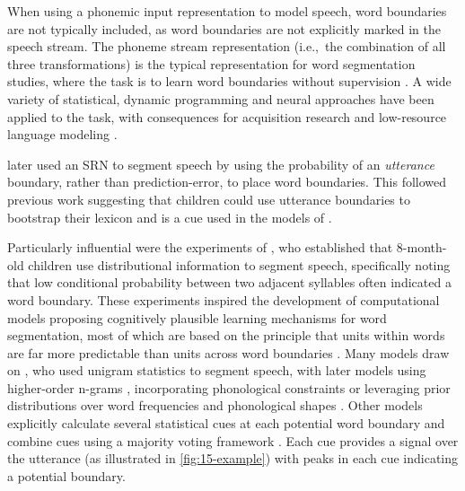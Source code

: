 When using a phonemic input representation to model speech, word boundaries are not typically included, as word boundaries are not explicitly marked in the speech stream. The phoneme stream representation (i.e.,\ the combination of all three transformations) is the typical representation for word segmentation studies, where the task is to learn word boundaries without supervision \citep{Brent1999}. A wide variety of statistical, dynamic programming and neural approaches have been applied to the task, with consequences for acquisition research and low-resource language modeling \citep{Blanchard2010, Coltekin2017, algayres_dp-parse_2022, goriely2023word}.


\citet{christiansen1998learning} later used an SRN to segment speech by using the probability of an \emph{utterance} boundary, rather than prediction-error, to place word boundaries. This followed previous work suggesting that children could use utterance boundaries to bootstrap their lexicon \citep{aslin1996models} and is a cue used in the models of \citet{ccoltekin2014explicit, goriely2023word}.


Particularly influential were the experiments of \citet{Saffran1996learning}, who established that 8-month-old children use distributional information to segment speech, specifically noting that low conditional probability %
between two adjacent syllables often indicated a word boundary. These experiments inspired the development of computational models proposing cognitively plausible learning mechanisms for word segmentation, most of which are based on the principle that units within words are far more predictable than units across word boundaries \citep{harris1955}. Many models draw on \citet{Brent1999}, who used unigram statistics to segment speech, with later models using higher-order n-grams \citep{Venkataraman2001}, incorporating phonological constraints \citep{Blanchard2010} or leveraging prior distributions over word frequencies and phonological shapes \citep{Goldwater2009}. Other models explicitly calculate several statistical cues at each potential word boundary and combine cues using a majority voting framework \citep{ccoltekin2014explicit, Coltekin2017, goriely2023word}. Each cue provides a signal over the utterance (as illustrated in \cref{fig:15-example}) with peaks in each cue indicating a potential boundary. 



